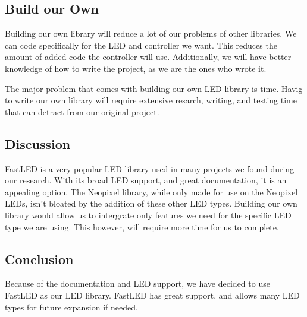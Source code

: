 	\subsection{Build our Own}
	\noindent Building our own library will reduce a lot of our problems of other
	libraries. We can code specifically for the LED and controller we want.
	This reduces the amount of added code the controller will use. Additionally,
	we will have better knowledge of how to write the project, as we are the
	ones who wrote it.

	\vspace{5mm}
	\noindent The major problem that comes with building our own LED library is time.
	Havig to write our own library will require extensive resarch, writing, and
	testing time that can detract from our original project.
	\subsection{Discussion}
	\noindent FastLED is a very popular LED library used in many projects we found
	during our research. With its broad LED support, and great documentation,
	it is an appealing option. The Neopixel library, while only made for use on
	the Neopixel LEDs, isn't bloated by the addition of these other LED types.
	Building our own library would allow us to intergrate only features we need
	for the specific LED type we are using. This however, will require more
	time for us to complete.
	\subsection{Conclusion}
	\noindent Because of the documentation and LED support, we have decided to use
	FastLED as our LED library. FastLED has great support, and allows many LED
	types for future expansion if needed.
